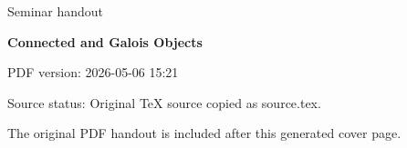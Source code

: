 \documentclass[11pt,a4paper]{article}
\newcommand{\seminartitle}{Connected and Galois Objects}
\newcommand{\seminarsubtitle}{Seminar handout}
\newcommand{\seminardate}{2026-05-06 15:21}
\newcommand{\seminarsourcestatus}{Original TeX source copied as source.tex.}
\begin{document}
\begin{titlepage}
\thispagestyle{empty}
\vspace*{0.16\textheight}
{\Large\color{seminarblue}\seminarsubtitle\par}
\vspace{1.5em}
{\LARGE\bfseries \seminartitle\par}
\vspace{2em}
{\large PDF version: \seminardate\par}
\vfill
{\small Source status: \seminarsourcestatus\par}
\vspace{1em}
{\small The original PDF handout is included after this generated cover page.\par}
\end{titlepage}

\clearpage
\hypersetup{pageanchor=false}

\end{document}
